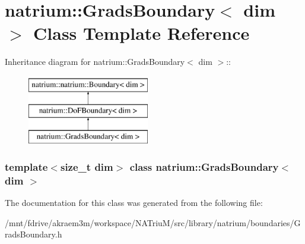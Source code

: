 \hypertarget{classnatrium_1_1GradsBoundary}{
\section{natrium::GradsBoundary$<$ dim $>$ Class Template Reference}
\label{classnatrium_1_1GradsBoundary}
}
Inheritance diagram for natrium::GradsBoundary$<$ dim $>$::\begin{figure}[H]
\begin{center}
\leavevmode
\includegraphics[height=3cm]{classnatrium_1_1GradsBoundary}
\end{center}
\end{figure}
\subsubsection*{template$<$size\_\-t dim$>$ class natrium::GradsBoundary$<$ dim $>$}



The documentation for this class was generated from the following file:\begin{DoxyCompactItemize}
\item 
/mnt/fdrive/akraem3m/workspace/NATriuM/src/library/natrium/boundaries/GradsBoundary.h\end{DoxyCompactItemize}
